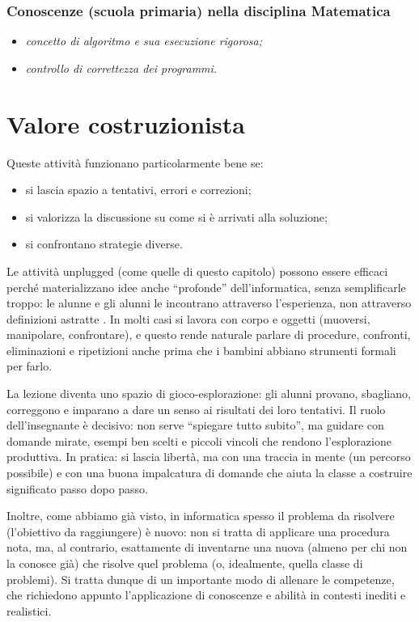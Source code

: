 \subsubsection{Conoscenze (scuola primaria) nella disciplina Matematica}

\begin{itemize}
\item
  \emph{concetto di algoritmo e sua esecuzione rigorosa;}
\item
  \emph{controllo di correttezza dei programmi.}
\end{itemize}

\section{Valore costruzionista }\label{valore-costruzionista-3}

Queste attività funzionano particolarmente bene se:

\begin{itemize}
\item
  si lascia spazio a tentativi, errori e correzioni;
\item
  si valorizza la discussione su come si è arrivati alla soluzione;
\item
  si confrontano strategie diverse.
\end{itemize}

Le attività unplugged (come quelle di questo capitolo) possono essere efficaci perché materializzano idee anche ``profonde'' dell'informatica, senza semplificarle troppo: le alunne e gli alunni le incontrano attraverso l'esperienza, non attraverso definizioni astratte \parencite{bell-lodi-2019}. In molti casi si lavora con corpo e oggetti (muoversi, manipolare, confrontare), e questo rende naturale parlare di procedure, confronti, eliminazioni e ripetizioni anche prima che i bambini abbiano strumenti formali per farlo.

La lezione diventa uno spazio di gioco-esplorazione: gli alunni provano, sbagliano, correggono e imparano a dare un senso ai risultati dei loro tentativi. Il ruolo dell'insegnante è decisivo: non serve ``spiegare tutto subito'', ma guidare con domande mirate, esempi ben scelti e piccoli vincoli che rendono l'esplorazione produttiva. In pratica: si lascia libertà, ma con una traccia in mente (un percorso possibile) e con una buona impalcatura di domande che aiuta la classe a costruire significato passo dopo passo.

Inoltre, come abbiamo già visto, in informatica spesso il problema da risolvere (l'obiettivo da raggiungere) è nuovo: non si tratta di applicare una procedura nota, ma, al contrario, esattamente di inventarne una nuova (almeno per chi non la conosce già) che risolve quel problema (o, idealmente, quella classe di problemi). Si tratta dunque di un importante modo di allenare le competenze, che richiedono appunto l'applicazione di conoscenze e abilità in contesti inediti e realistici.

